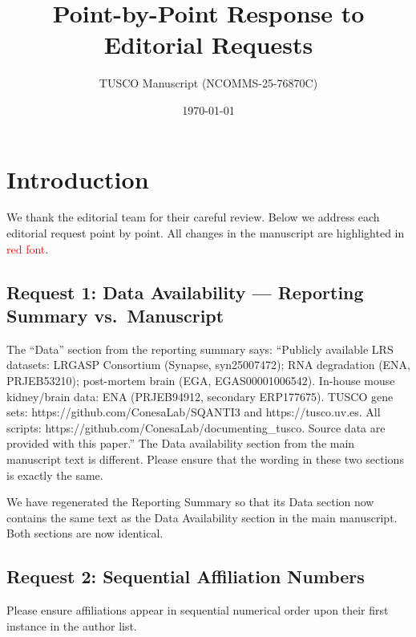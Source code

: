 \documentclass[11pt]{article}
\title{\textbf{Point-by-Point Response to Editorial Requests}}
\author{TUSCO Manuscript (NCOMMS-25-76870C)}
\date{\today}
\begin{document}
\maketitle

\section*{Introduction}

We thank the editorial team for their careful review. Below we address each editorial request point by point. All changes in the manuscript are highlighted in \textcolor{red}{red font}.

\bigskip

\subsection*{Request 1: Data Availability --- Reporting Summary vs.\ Manuscript}

\begin{editorrequest}
The ``Data'' section from the reporting summary says: ``Publicly available LRS datasets: LRGASP Consortium (Synapse, syn25007472); RNA degradation (ENA, PRJEB53210); post-mortem brain (EGA, EGAS00001006542). In-house mouse kidney/brain data: ENA (PRJEB94912, secondary ERP177675). TUSCO gene sets: https://github.com/ConesaLab/SQANTI3 and https://tusco.uv.es. All scripts: https://github.com/ConesaLab/documenting\_tusco. Source data are provided with this paper.'' The Data availability section from the main manuscript text is different. Please ensure that the wording in these two sections is exactly the same.
\end{editorrequest}

\begin{responseboxnew}
We have regenerated the Reporting Summary so that its Data section now contains the same text as the Data Availability section in the main manuscript. Both sections are now identical.
\end{responseboxnew}

\subsection*{Request 2: Sequential Affiliation Numbers}

\begin{editorrequest}
Please ensure affiliations appear in sequential numerical order upon their first instance in the author list.
\end{editorrequest}
\end{document}
